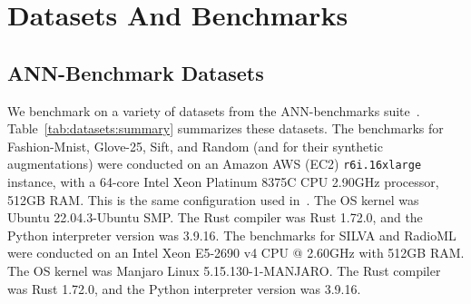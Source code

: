 \section{Datasets And Benchmarks}
\label{sec:datasets-and-benchmarks}

\subsection{ANN-Benchmark Datasets}
\label{sec:datasets-and-benchmarks:ann-benchmark-datasets}

We benchmark on a variety of datasets from the ANN-benchmarks suite~\cite{Aumller2018ANNBenchmarksAB}.
Table~\ref{tab:datasets:summary} summarizes these datasets.
The benchmarks for Fashion-Mnist, Glove-25, Sift, and Random (and for their synthetic augmentations) were conducted on an Amazon AWS (EC2) \texttt{r6i.16xlarge} instance, with a 64-core Intel Xeon Platinum 8375C CPU 2.90GHz processor, 512GB RAM.
This is the same configuration used in~\cite{Aumller2018ANNBenchmarksAB}.
The OS kernel was Ubuntu 22.04.3-Ubuntu SMP.
The Rust compiler was Rust 1.72.0, and the Python interpreter version was 3.9.16.
The benchmarks for SILVA and RadioML were conducted on an Intel Xeon E5-2690 v4 CPU @ 2.60GHz with 512GB RAM.
The OS kernel was Manjaro Linux 5.15.130-1-MANJARO.
The Rust compiler was Rust 1.72.0, and the Python interpreter version was 3.9.16.

